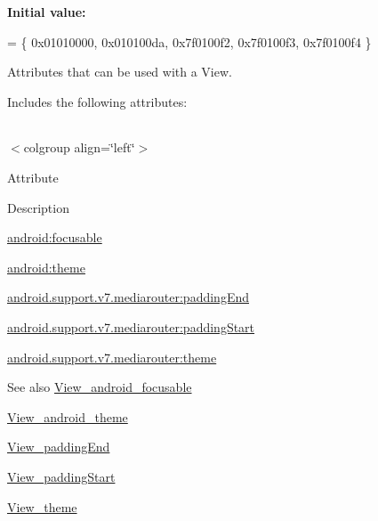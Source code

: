 {\bfseries Initial value\+:}
\begin{DoxyCode}
= \{
            0x01010000, 0x010100da, 0x7f0100f2, 0x7f0100f3,
            0x7f0100f4
        \}
\end{DoxyCode}
Attributes that can be used with a View. 

Includes the following attributes\+:

\tabulinesep=1mm
\begin{longtabu} spread 0pt [c]{*{0}{|X[-1]}|}
\hline
\end{longtabu}
$<$colgroup align=\char`\"{}left\char`\"{}$>$ 

Attribute

Description 

{\ttfamily \hyperlink{classandroid_1_1support_1_1v7_1_1mediarouter_1_1R_1_1styleable_a865946f96b6ca68bf9a056975bd533f9}{android\+:focusable}}

{\ttfamily \hyperlink{classandroid_1_1support_1_1v7_1_1mediarouter_1_1R_1_1styleable_a9d71fcd300bcf0a9a2e237edd5d3a4b8}{android\+:theme}}

{\ttfamily \hyperlink{classandroid_1_1support_1_1v7_1_1mediarouter_1_1R_1_1styleable_a9f8c2722c7aba33ebb2dbe4eed4fa4b4}{android.\+support.\+v7.\+mediarouter\+:padding\+End}}

{\ttfamily \hyperlink{classandroid_1_1support_1_1v7_1_1mediarouter_1_1R_1_1styleable_a22686a2c312cc840de8e771ac598731f}{android.\+support.\+v7.\+mediarouter\+:padding\+Start}}

{\ttfamily \hyperlink{classandroid_1_1support_1_1v7_1_1mediarouter_1_1R_1_1styleable_ae0961a211c233453ac6649347600b383}{android.\+support.\+v7.\+mediarouter\+:theme}}

\begin{DoxySeeAlso}{See also}
\hyperlink{classandroid_1_1support_1_1v7_1_1mediarouter_1_1R_1_1styleable_a865946f96b6ca68bf9a056975bd533f9}{View\+\_\+android\+\_\+focusable} 

\hyperlink{classandroid_1_1support_1_1v7_1_1mediarouter_1_1R_1_1styleable_a9d71fcd300bcf0a9a2e237edd5d3a4b8}{View\+\_\+android\+\_\+theme} 

\hyperlink{classandroid_1_1support_1_1v7_1_1mediarouter_1_1R_1_1styleable_a9f8c2722c7aba33ebb2dbe4eed4fa4b4}{View\+\_\+padding\+End} 

\hyperlink{classandroid_1_1support_1_1v7_1_1mediarouter_1_1R_1_1styleable_a22686a2c312cc840de8e771ac598731f}{View\+\_\+padding\+Start} 

\hyperlink{classandroid_1_1support_1_1v7_1_1mediarouter_1_1R_1_1styleable_ae0961a211c233453ac6649347600b383}{View\+\_\+theme} 
\end{DoxySeeAlso}
\mbox{\label{classandroid_1_1support_1_1v7_1_1mediarouter_1_1R_1_1styleable_a865946f96b6ca68bf9a056975bd533f9}} 
